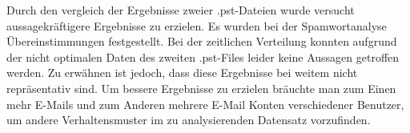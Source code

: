\noindent Durch den vergleich der Ergebnisse zweier .pst-Dateien wurde versucht aussagekräftigere Ergebnisse zu erzielen. Es wurden bei der Spamwortanalyse Übereinstimmungen festgestellt. Bei der zeitlichen Verteilung konnten aufgrund der nicht optimalen Daten des zweiten .pst-Files leider keine Aussagen getroffen werden. Zu erwähnen ist jedoch, dass diese Ergebnisse bei weitem nicht repräsentativ sind. Um bessere Ergebnisse zu erzielen bräuchte man zum Einen mehr E-Mails und zum Anderen mehrere E-Mail Konten verschiedener Benutzer, um andere Verhaltensmuster im zu analysierenden Datensatz vorzufinden. \newpage